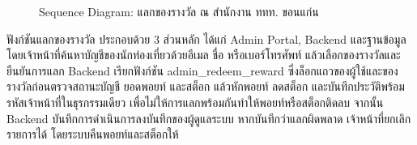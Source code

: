 \begin{figure}[H]
\centering
{}
\caption{Sequence Diagram: แลกของรางวัล ณ สำนักงาน ททท. ขอนแก่น}
\label{fig:sequence_point_redeem}
\end{figure}

ฟังก์ชันแลกของรางวัล ประกอบด้วย 3 ส่วนหลัก ได้แก่ Admin Portal, Backend และฐานข้อมูล โดยเจ้าหน้าที่ค้นหาบัญชีของนักท่องเที่ยวด้วยอีเมล ชื่อ หรือเบอร์โทรศัพท์ แล้วเลือกของรางวัลและยืนยันการแลก Backend เรียกฟังก์ชัน admin\_redeem\_reward ซึ่งล็อกแถวของผู้ใช้และของรางวัลก่อนตรวจสถานะบัญชี ยอดพอยท์ และสต็อก แล้วหักพอยท์ ลดสต็อก และบันทึกประวัติพร้อมรหัสเจ้าหน้าที่ในธุรกรรมเดียว เพื่อไม่ให้การแลกพร้อมกันทำให้พอยท์หรือสต็อกติดลบ จากนั้น Backend บันทึกการดำเนินการลงบันทึกของผู้ดูแลระบบ หากบันทึกว่าแลกผิดพลาด เจ้าหน้าที่ยกเลิกรายการได้ โดยระบบคืนพอยท์และสต็อกให้

